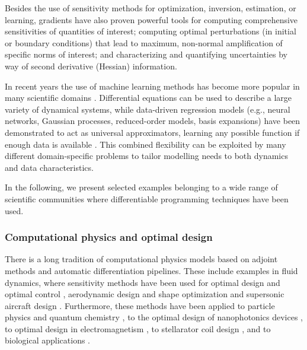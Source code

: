 Besides the use of sensitivity methods for optimization, inversion, estimation, or learning, gradients have also proven powerful tools for computing comprehensive sensitivities of quantities of interest; computing optimal perturbations (in initial or boundary conditions) that lead to maximum, non-normal amplification of specific norms of interest; and characterizing and quantifying uncertainties by way of second derivative (Hessian) information.

In recent years the use of machine learning methods has become more popular in many scientific domains \cite{ml_clouds_climate, chem_ml_review, bio_ml_review}. 
Differential equations can be used to describe a large variety of dynamical systems, while data-driven regression models (e.g., neural networks, Gaussian processes, reduced-order models, basis expansions) have been demonstrated to act as universal approximators, learning any possible function if enough data is available \cite{gorban_1998}. 
This combined flexibility can be exploited by many different domain-specific problems to tailor modelling needs to both dynamics and data characteristics.

In the following, we present selected examples belonging to a wide range of scientific communities where differentiable programming techniques have been used. 

\subsubsection{Computational physics and optimal design}

There is a long tradition of computational physics models based on adjoint methods and automatic differentiation pipelines. These include examples in fluid dynamics, where sensitivity methods have been used for optimal design and optimal control
\cite{lions1971optimal, pironneau2005optimal}, aerodynamic design and shape optimization
\cite{Jameson_1988,Giles_Pierce_2000, mohammadi2009applied,allaire2014shape} and 
supersonic aircraft design \cite{hu2010supersonic, fike2013multi}.
Furthermore, these methods have been applied to particle physics \cite{Dorigo.2022} and quantum chemistry \cite{Arrazola.2021}, to the optimal design of nanophotonics devices  \cite{Molesky_Lin_Piggott_Jin_Vucković_Rodriguez_2018}, to optimal design in electromagnetism \cite{Georgieva_Glavic_Bakr_Bandler_2002}, to stellarator coil design \cite{McGreivy_stellarator_2021}, and to biological applications \cite{Strouwen2022}.

